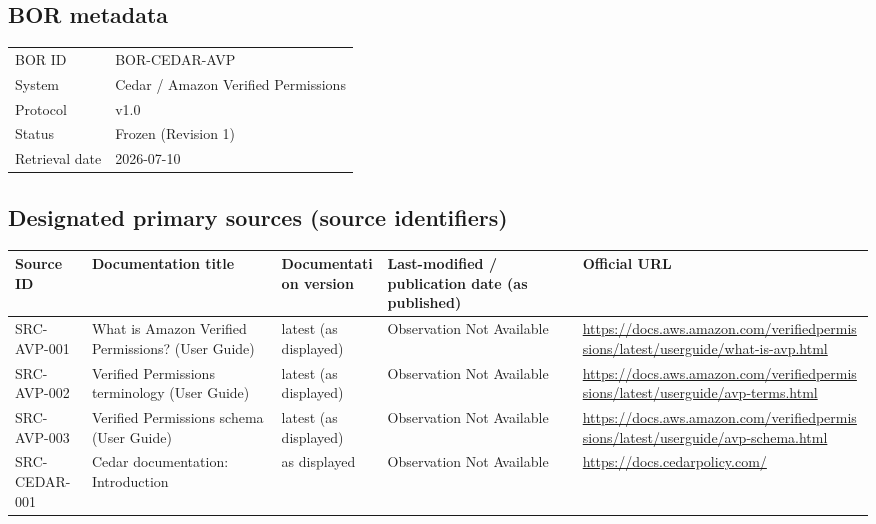 \documentclass[11pt]{article}
\begin{document}
\subsection*{BOR metadata}
\begin{tabular}{@{}L{2.2in}L{4.2in}@{}}
\toprule
BOR ID & BOR-CEDAR-AVP\\
System & Cedar / Amazon Verified Permissions\\
Protocol & v1.0\\
Status & Frozen (Revision 1)\\
Retrieval date & 2026-07-10\\
\bottomrule
\end{tabular}

\subsection*{Designated primary sources (source identifiers)}
\begin{longtable}{@{}L{1.6in}L{2.9in}L{1.0in}L{0.9in}L{1.9in}@{}}
\toprule
Source ID & Documentation title & Documentation version & Last-modified / publication date (as published) & Official URL\\
\midrule
\endhead
SRC-AVP-001 & What is Amazon Verified Permissions? (User Guide) & latest (as displayed) & Observation Not Available & \url{https://docs.aws.amazon.com/verifiedpermissions/latest/userguide/what-is-avp.html}\\
SRC-AVP-002 & Verified Permissions terminology (User Guide) & latest (as displayed) & Observation Not Available & \url{https://docs.aws.amazon.com/verifiedpermissions/latest/userguide/avp-terms.html}\\
SRC-AVP-003 & Verified Permissions schema (User Guide) & latest (as displayed) & Observation Not Available & \url{https://docs.aws.amazon.com/verifiedpermissions/latest/userguide/avp-schema.html}\\
SRC-CEDAR-001 & Cedar documentation: Introduction & as displayed & Observation Not Available & \url{https://docs.cedarpolicy.com/}\\
\bottomrule
\end{longtable}
\end{document}
